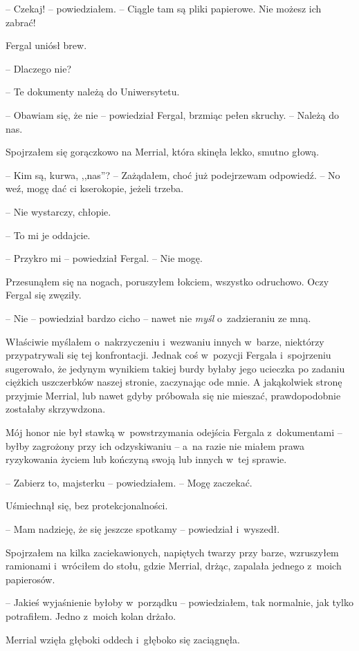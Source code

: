 \documentclass[oneside,polish,11pt,sfheadings]{mwbk}
\begin{document}
-- Czekaj! -- powiedziałem. -- Ciągle tam są pliki papierowe. Nie możesz
ich zabrać!

Fergal uniósł brew. 

-- Dlaczego nie?

-- Te dokumenty należą do Uniwersytetu.

-- Obawiam się, że nie -- powiedział Fergal, brzmiąc pełen skruchy. -- Należą do nas.

Spojrzałem się gorączkowo na Merrial, która skinęła lekko, smutno głową.

-- Kim są, kurwa, ,,nas''? -- Zażądałem, choć już podejrzewam odpowiedź. -- No
weź, mogę dać ci kserokopie, jeżeli trzeba.

-- Nie wystarczy, chłopie.

-- To mi je oddajcie.

-- Przykro mi -- powiedział Fergal. -- Nie mogę.

Przesunąłem się na nogach, poruszyłem łokciem, wszystko odruchowo. Oczy
Fergal się zwęziły.

-- Nie -- powiedział bardzo cicho -- nawet nie \textit{myśl} o~zadzieraniu ze
mną.

Właściwie myślałem o~nakrzyczeniu i~wezwaniu innych w~barze, niektórzy
przypatrywali się tej konfrontacji. Jednak coś w~pozycji Fergala i~spojrzeniu sugerowało, że jedynym wynikiem takiej burdy byłaby jego
ucieczka po zadaniu ciężkich uszczerbków naszej stronie, zaczynając ode
mnie. A jakąkolwiek stronę przyjmie Merrial, lub nawet gdyby próbowała
się nie mieszać, prawdopodobnie zostałaby skrzywdzona.

Mój honor nie był stawką w~powstrzymania odejścia Fergala z~dokumentami
-- byłby zagrożony przy ich odzyskiwaniu -- a~na razie nie miałem prawa
ryzykowania życiem lub kończyną swoją lub innych w~tej sprawie.

-- Zabierz to, majsterku -- powiedziałem. -- Mogę zaczekać.

Uśmiechnął się, bez protekcjonalności.

-- Mam nadzieję, że się jeszcze spotkamy -- powiedział i~wyszedł.

Spojrzałem na kilka zaciekawionych, napiętych twarzy przy barze,
wzruszyłem ramionami i~wróciłem do stołu, gdzie Merrial, drżąc, zapalała
jednego z~moich papierosów.

-- Jakieś wyjaśnienie byłoby w~porządku -- powiedziałem, tak normalnie,
jak tylko potrafiłem. Jedno z~moich kolan drżało.

Merrial wzięła głęboki oddech i~głęboko się zaciągnęła.
\end{document}
